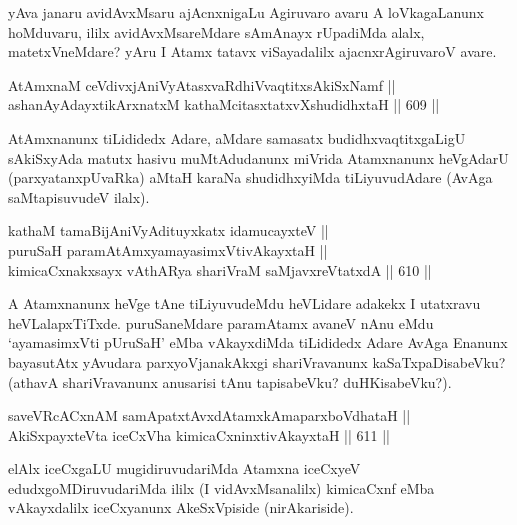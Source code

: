 \begin{artha}
yAva janaru avidAvxMsaru ajAcnxnigaLu Agiruvaro avaru A loVkagaLanunx
hoMduvaru, ililx avidAvxMsareMdare sAmAnayx rUpadiMda alalx,
matetxVneMdare? yAru I Atamx tatavx viSayadalilx ajacnxrAgiruvaroV avare.
\end{artha}


\begin{shl}
AtAmxnaM ceVdivxjAniVyAtasxvaRdhiVvaqtitxsAkiSxNamf || \\
ashanAyAdayxtikArxnatxM kathaMcitasxtatxvXshudidhxtaH \hfill || 609 ||  
\end{shl}

\begin{artha}
AtAmxnanunx tiLididedx Adare, aMdare samasatx budidhxvaqtitxgaLigU
sAkiSxyAda matutx hasivu muMtAdudanunx miVrida Atamxnanunx heVgAdarU
(parxyatanxpUvaRka) aMtaH karaNa shudidhxyiMda tiLiyuvudAdare (AvAga saMtapisuvudeV ilalx).
\end{artha}


\begin{shl}
kathaM tamaBijAniVyAdituyxkatx idamucayxteV || \\
puruSaH paramAtAmx\s yamayasimxVtivAkayxtaH || \\
kimicaCxnakxsayx vA\s thARya shariVraM saMjavxreVtatxdA \hfill || 610 ||  
\end{shl}

\begin{artha}
A Atamxnanunx heVge tAne tiLiyuvudeMdu heVLidare adakekx I utatxravu heVLalapxTiTxde. puruSaneMdare paramAtamx avaneV nAnu eMdu `ayamasimxVti pUruSaH' eMba vAkayxdiMda tiLididedx Adare AvAga Enanunx bayasutAtx yAvudara parxyoVjanakAkxgi shariVravanunx kaSaTxpaDisabeVku? (athavA shariVravanunx anusarisi tAnu tapisabeVku? duHKisabeVku?).
\end{artha}


\begin{shl}
saveVRcACxnAM samApatxtAvxdAtamxkAmaparxboVdhataH || \\
AkiSxpayxteV\s ta iceCxVha kimicaCxninxtivAkayxtaH \hfill || 611 ||  
\end{shl}

\begin{artha}
elAlx iceCxgaLU mugidiruvudariMda Atamxna iceCxyeV edudxgoMDiruvudariMda ililx (I vidAvxMsanalilx) kimicaCxnf eMba vAkayxdalilx iceCxyanunx AkeSxVpiside (nirAkariside).
\end{artha}

